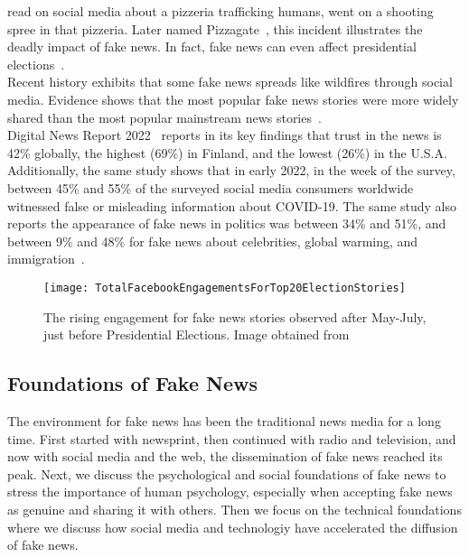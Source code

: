 read on social media about a pizzeria trafficking humans, went on a shooting spree in that pizzeria. Later named
Pizzagate~\parencite{Pizzagate_Fisher}, this incident illustrates the deadly impact of fake news. In fact, fake news can even affect presidential elections~\parencite{SocialMediaAndFakeNewsIn2016Election_Allcott, TrumpWonBecauseOfFacebook_Read}.\\
Recent history exhibits that some fake news spreads like wildfires through social media. Evidence shows that the most popular fake news stories
were more widely shared than the most popular mainstream news stories~\parencite{Buzzfeed_FakeNewsOutperformRealNews_Silverman}.\\
Digital News Report 2022~\parencite{ReutersInstituteDigitalNewsReport} reports in its key findings that trust in the news is 42\% globally,
the highest (69\%) in Finland, and the lowest (26\%) in the U.S.A. Additionally, the same study shows that in early 2022, in the week of the
survey, between 45\% and 55\% of the surveyed social media consumers worldwide witnessed false or misleading information about COVID-19. The
same study also reports the appearance of fake news in politics was between 34\% and 51\%, and between 9\% and 48\% for fake news about
celebrities, global warming, and immigration~\parencite{StatistaUsageOfSocialMedia_Watson}.
\begin{figure}
    \centering
    \texttt{[image: TotalFacebookEngagementsForTop20ElectionStories]}
    \caption[Total Facebook Engagements for Top 20 Election Stories]{The rising engagement for fake news stories observed after May-July, just before Presidential Elections. Image obtained from~\parencite{Buzzfeed_FakeNewsOutperformRealNews_Silverman}}\label{fig:TotalFacebookEngagementsForTop20ElectionStories}
\end{figure}
\subsection{Foundations of Fake News}
\label{subsec:fakeNewsDetection_FoundationsOfFakeNews}
The environment for fake news has been the traditional news media for a long time. First started with newsprint,
then continued with radio and television, and now with social media and the web, the dissemination of fake news reached its peak. Next, we discuss the psychological and social foundations of fake news to stress the importance
of human psychology, especially when accepting fake news as genuine and sharing it with others. Then we focus on
the technical foundations where we discuss how social media and technologiy have accelerated the diffusion of fake news.\\

